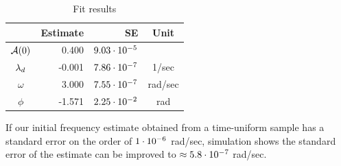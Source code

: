 \begin{table}[h]
  \centering
  \caption{Fit results\label{tbl:FitRes}}
  \begin{tabular}{crrc}
    \hline
    & Estimate &             SE &  Unit   \\ \hline
    $\mathcal{A}(0)$ &   0.400 & ${9.03}\cdot 10^{-5}$ &         \\
    $\lambda_d$   &  -0.001 & ${7.86}\cdot 10^{-7}$ &  1/sec  \\
    $\omega$  &   3.000 & ${7.55}\cdot 10^{-7}$ & rad/sec \\
    $\phi$   &  -1.571 & ${2.25}\cdot 10^{-2}$ &   rad   \\ \hline
  \end{tabular}
\end{table}

If our initial frequency estimate obtained from a time-uniform sample has a standard error on the order of ${1}\cdot 10^{-6}$ rad/sec, simulation shows the standard error of the estimate can be improved to $\approx {5.8}\cdot 10^{-7}$ rad/sec.
